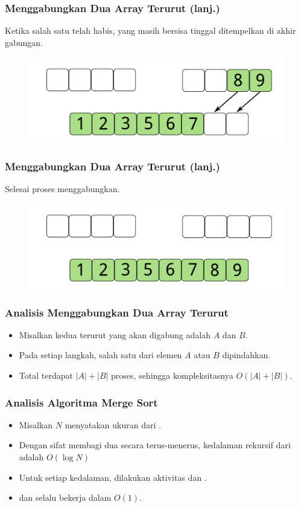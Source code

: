 \begin{frame}
\frametitle{Menggabungkan Dua Array Terurut (lanj.)}
Ketika salah satu \farray telah habis, \farray yang masih bersisa tinggal ditempelkan di akhir \farray gabungan.
\begin{figure}
  \centering
  \includegraphics[width=10 cm]{asset/merge-array-pair-8.pdf}
\end{figure}
\end{frame}

\begin{frame}
\frametitle{Menggabungkan Dua Array Terurut (lanj.)}
Selesai proses menggabungkan.
\begin{figure}
  \centering
  \includegraphics[width=10 cm]{asset/merge-array-pair-9.pdf}
\end{figure}
\end{frame}

\begin{frame}
\frametitle{Analisis Menggabungkan Dua Array Terurut}
\begin{itemize}
  \item Misalkan kedua \farray terurut yang akan digabung adalah $A$ dan $B$.
  \item Pada setiap langkah, salah satu dari elemen $A$ atau $B$ dipindahkan.
  \item Total terdapat $|A| + |B|$ proses, sehingga kompleksitasnya $O(|A| + |B|)$.
\end{itemize}
\end{frame}

\begin{frame}
\frametitle{Analisis Algoritma Merge Sort}
\begin{itemize}
  \item Misalkan $N$ menyatakan ukuran dari \farray.
  \item Dengan sifat membagi dua secara terus-menerus, kedalaman rekursif dari \fMergeSort adalah $O(\log{N})$
  \item Untuk setiap kedalaman, dilakukan aktivitas  dan .
  \item {} dan  selalu bekerja dalam $O(1)$.
\end{itemize}
\end{frame}

